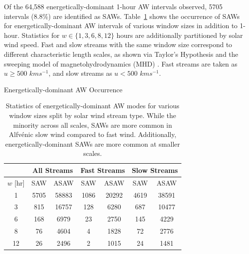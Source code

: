 \documentclass[twocolumn, times]{aastex631}
\begin{document}
Of the 64,588 energetically-dominant 1-hour AW intervals observed, 5705 intervals (8.8\%) are identified as SAWs. Table~\ref{tab:saw_stats} shows the occurrence of SAWs for energetically-dominant AW intervals of various window sizes in addition to 1-hour. Statistics for $w \in \{ 1, 3, 6, 8, 12\}$ hours are additionally partitioned by solar wind speed. Fast and slow streams with the same window size correspond to different characteristic length scales, as shown via Taylor's Hypothesis \citep{taylor1938} and the sweeping model of magnetohydrodynamics (MHD) \citep{bourouaine2019, bourouaine2020b}. Fast streams are taken as $u \geq 500$ $km s^{-1}$, and slow streams as $u<500$ $km s^{-1}$.
\begin{table}
    \centering
    Energetically-dominant AW Occurrence
    \begin{tabular}{ccccccc}
        \hline
        \hline
         &\multicolumn{2}{c}{All Streams}&  \multicolumn{2}{c}{Fast Streams}&  \multicolumn{2}{c}{Slow Streams}\\
         \hline
        $w$ [hr]&SAW&ASAW&  SAW&ASAW&  SAW&ASAW\\
        \hline
        1&5705&58883
&1086&20292&4619&38591\\
        3&815&16757
&128&6280&687&10477\\
        6&168&6979
&23&2750&145&4229\\
        8&76&4604
&4&1828&72&2776\\
        12&26&2496&2&1015&24&1481\\
    \end{tabular}
    \caption{Statistics of energetically-dominant AW modes for various window sizes split by solar wind stream type. While the minority across all scales, SAWs are more common in Alfv\'enic slow wind compared to fast wind. Additionally, energetically-dominant SAWs are more common at smaller scales.}
    \label{tab:saw_stats}
\end{table}
\end{document}
